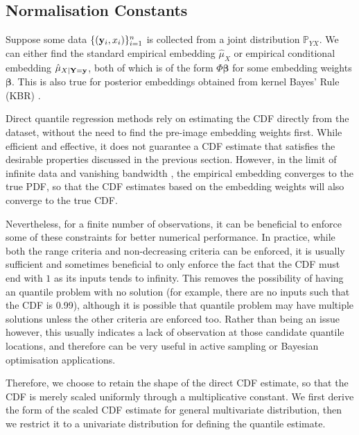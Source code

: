 \documentclass[twoside]{article} \usepackage{aistats2017}
\theoremstyle{definition}
\theoremstyle{theorem}
\newcommand{\rv}[1]{{#1}}
\begin{document}
	\subsection{Normalisation Constants}
	\label{sec:direct_quantile_regression:normalisation_constants}
	
		Suppose some data $\{(\mathbf{y}_{i}, x_{i})\}_{i = 1}^{n}$ is collected from a joint distribution $\mathbb{P}_{\rv{Y} \rv{X}}$. We can either find the standard empirical embedding $\hat{\mu}_{\rv{X}}$ or empirical conditional embedding $\hat{\mu}_{\rv{X} | \bvec{\rv{Y}} = \bvec{y}}$, both of which is of the form $\Phi \bm{\beta}$ for some embedding weights $\bm{\beta}$. This is also true for posterior embeddings obtained from kernel Bayes' Rule (KBR) \citep{fukumizu2013kernel}.
		
		Direct quantile regression methods rely on estimating the CDF directly from the dataset, without the need to find the pre-image embedding weights first. While efficient and effective, it does not guarantee a CDF estimate that satisfies the desirable properties discussed in the previous section. However, in the limit of infinite data and vanishing bandwidth \citep{kanagawa2016filtering}, the empirical embedding converges to the true PDF, so that the CDF estimates based on the embedding weights will also converge to the true CDF.
		
		Nevertheless, for a finite number of observations, it can be beneficial to enforce some of these constraints for better numerical performance. In practice, while both the range criteria and non-decreasing criteria can be enforced, it is usually sufficient and sometimes beneficial to only enforce the fact that the CDF must end with $1$ as its inputs tends to infinity. This removes the possibility of having an quantile problem with no solution (for example, there are no inputs such that the CDF is 0.99), although it is possible that quantile problem may have multiple solutions unless the other criteria are enforced too. Rather than being an issue however, this usually indicates a lack of observation at those candidate quantile locations, and therefore can be very useful in active sampling or Bayesian optimisation applications.
		
		Therefore, we choose to retain the shape of the direct CDF estimate, so that the CDF is merely scaled uniformly through a multiplicative constant. We first derive the form of the scaled CDF estimate for general multivariate distribution, then we restrict it to a univariate distribution for defining the quantile estimate.
		
\end{document}
